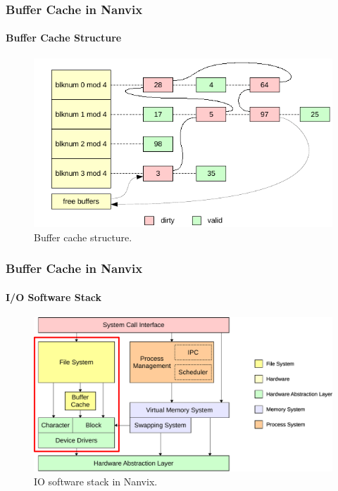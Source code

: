 \documentclass{beamer}
\begin{document}
	\begin{frame}
	\frametitle{Buffer Cache in Nanvix}
	\framesubtitle{Buffer Cache Structure}
		\begin{figure}
			\centering
			\includegraphics[width=0.9\linewidth]{buffer-cache}
			\caption{Buffer cache structure.}
		\end{figure}
	\end{frame}

	\begin{frame}
	\frametitle{Buffer Cache in Nanvix}
	\framesubtitle{I/O Software Stack}
		\begin{figure}
			\centering
			\includegraphics[width=0.9\linewidth]{io-software-stack}
			\caption{IO software stack in Nanvix.}
		\end{figure}
	\end{frame}
\end{document}
